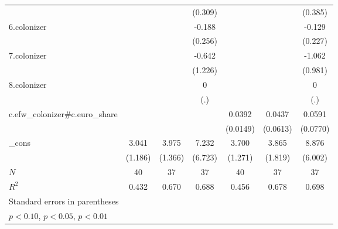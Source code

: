 {\begin{tabular}{l*{6}{c}}
            &                     &                     &     (0.309)         &                     &                     &     (0.385)         \\
[1em]
6.colonizer &                     &                     &      -0.188         &                     &                     &      -0.129         \\
            &                     &                     &     (0.256)         &                     &                     &     (0.227)         \\
[1em]
7.colonizer &                     &                     &      -0.642         &                     &                     &      -1.062         \\
            &                     &                     &     (1.226)         &                     &                     &     (0.981)         \\
[1em]
8.colonizer &                     &                     &           0         &                     &                     &           0         \\
            &                     &                     &         (.)         &                     &                     &         (.)         \\
[1em]
c.efw\_colonizer#c.euro\_share&                     &                     &                     &      0.0392\sym{**} &      0.0437         &      0.0591         \\
            &                     &                     &                     &    (0.0149)         &    (0.0613)         &    (0.0770)         \\
[1em]
\_cons      &       3.041\sym{*}  &       3.975\sym{**} &       7.232         &       3.700\sym{**} &       3.865\sym{*}  &       8.876         \\
            &     (1.186)         &     (1.366)         &     (6.723)         &     (1.271)         &     (1.819)         &     (6.002)         \\
\hline
\(N\)       &          40         &          37         &          37         &          40         &          37         &          37         \\
\(R^{2}\)   &       0.432         &       0.670         &       0.688         &       0.456         &       0.678         &       0.698         \\
\hline\hline
\multicolumn{7}{l}{\footnotesize Standard errors in parentheses}\\
\multicolumn{7}{l}{\footnotesize \sym{*} \(p<0.10\), \sym{**} \(p<0.05\), \sym{***} \(p<0.01\)}\\
\end{tabular}
}
